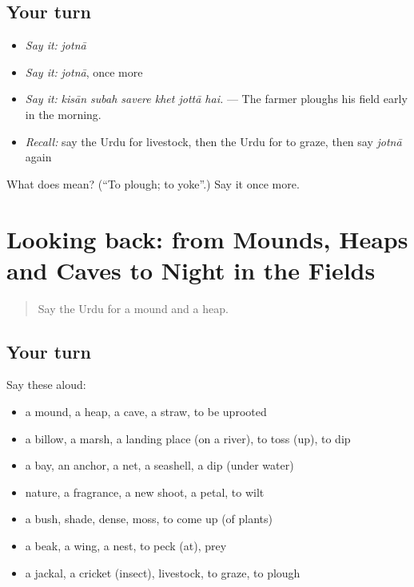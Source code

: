 \subsection*{Your turn}
\begin{itemize}
\raggedright
  \item \emph{Say it:} \emph{jotnā}
  \item \emph{Say it:} \emph{jotnā}, once more
  \item \emph{Say it:} \emph{kisān subah savere khet jottā hai.} — The farmer ploughs his field early in the morning.
  \item \emph{Recall:} say the Urdu for livestock, then the Urdu for to graze, then say \emph{jotnā} again
\end{itemize}

\begin{tcolorbox}[breakable,colback=teal!4,colframe=teal!35!black,title={Before you move on}]
What does  mean? (\textquotedblleft{}To plough; to yoke\textquotedblright{}.) Say it once more.
\end{tcolorbox}
\section[(dialogue)]{Looking back: from Mounds, Heaps and Caves to Night in the Fields}

\label{lesson:UR-R439-review-433-439}



\begin{quote}
Say the Urdu for a mound and a heap.
\end{quote}

\subsection*{Your turn}
Say these aloud:

\begin{itemize}
\raggedright
  \item a mound, a heap, a cave, a straw, to be uprooted
  \item a billow, a marsh, a landing place (on a river), to toss (up), to dip
  \item a bay, an anchor, a net, a seashell, a dip (under water)
  \item nature, a fragrance, a new shoot, a petal, to wilt
  \item a bush, shade, dense, moss, to come up (of plants)
  \item a beak, a wing, a nest, to peck (at), prey
  \item a jackal, a cricket (insect), livestock, to graze, to plough
\end{itemize}


